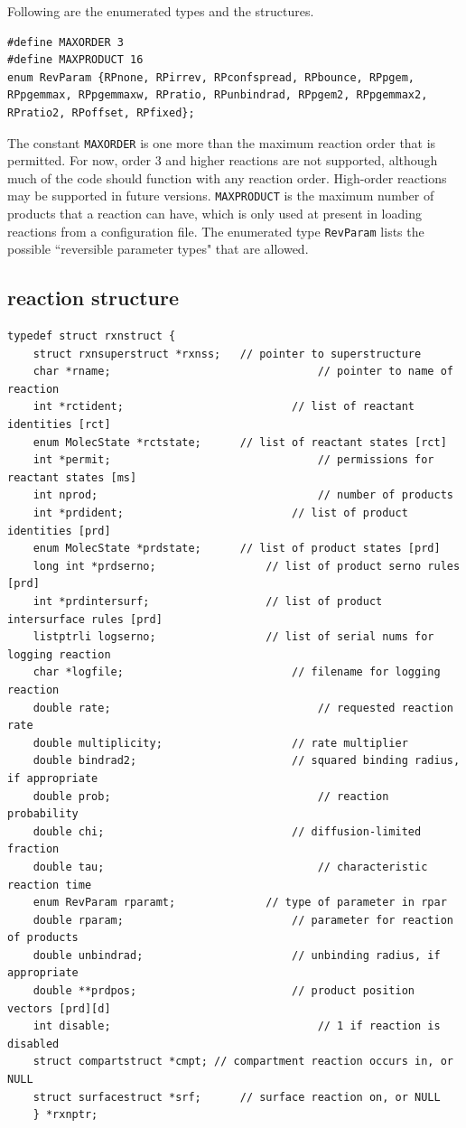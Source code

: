 \documentclass {scrbook}
\newcommand {\ttt} {\texttt}
\begin{document}
Following are the enumerated types and the structures.

\begin{lstlisting}
#define MAXORDER 3
#define MAXPRODUCT 16
enum RevParam {RPnone, RPirrev, RPconfspread, RPbounce, RPpgem, RPpgemmax, RPpgemmaxw, RPratio, RPunbindrad, RPpgem2, RPpgemmax2, RPratio2, RPoffset, RPfixed};
\end{lstlisting}

The constant \ttt{MAXORDER} is one more than the maximum reaction order that is permitted. For now, order 3 and higher reactions are not supported, although much of the code should function with any reaction order. High-order reactions may be supported in future versions. \ttt{MAXPRODUCT} is the maximum number of products that a reaction can have, which is only used at present in loading reactions from a configuration file. The enumerated type \ttt{RevParam} lists the possible ``reversible parameter types" that are allowed.

\subsection{reaction structure}

\begin{lstlisting}
typedef struct rxnstruct {
	struct rxnsuperstruct *rxnss;	// pointer to superstructure
	char *rname;								// pointer to name of reaction
	int *rctident;							// list of reactant identities [rct]
	enum MolecState *rctstate;		// list of reactant states [rct]
	int *permit;								// permissions for reactant states [ms]
	int nprod;									// number of products
	int *prdident;							// list of product identities [prd]
	enum MolecState *prdstate;		// list of product states [prd]
	long int *prdserno;					// list of product serno rules [prd]
	int *prdintersurf;					// list of product intersurface rules [prd]
	listptrli logserno;					// list of serial nums for logging reaction
	char *logfile;							// filename for logging reaction
	double rate;								// requested reaction rate
	double multiplicity;					// rate multiplier
	double bindrad2;						// squared binding radius, if appropriate
	double prob;								// reaction probability
	double chi;								// diffusion-limited fraction
	double tau;									// characteristic reaction time
	enum RevParam rparamt;				// type of parameter in rpar
	double rparam;							// parameter for reaction of products
	double unbindrad;						// unbinding radius, if appropriate
	double **prdpos;						// product position vectors [prd][d]
	int disable;								// 1 if reaction is disabled
	struct compartstruct *cmpt;	// compartment reaction occurs in, or NULL
	struct surfacestruct *srf;		// surface reaction on, or NULL
	} *rxnptr;
\end{lstlisting}
\end{document}
